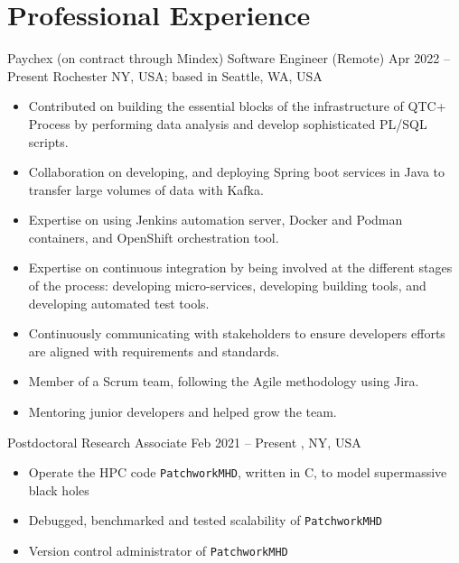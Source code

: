 \section{Professional Experience}

\cventry{}%
{Paychex (on contract through Mindex)}%
{Software Engineer (Remote)}%
{Apr 2022 -- Present}%
{Rochester NY, USA; based in Seattle, WA, USA}%
{%
\begin{itemize}
	\item Contributed on building the essential blocks of the infrastructure of QTC+ Process by performing data analysis and develop sophisticated PL/SQL scripts.
	\item Collaboration on developing, and deploying Spring boot services in Java to transfer large volumes of data with Kafka.
	\item Expertise on using Jenkins automation server, Docker and Podman containers, and OpenShift orchestration tool.
	\item Expertise on continuous integration by being involved at the different stages of the process: developing micro-services, developing building tools, and developing automated test tools.
	\item Continuously communicating with stakeholders to ensure developers efforts are aligned with requirements and standards.
	\item Member of a Scrum team, following the Agile methodology using Jira.
	\item Mentoring junior developers and helped grow the team.
\end{itemize}
}
\cventry{}%
{\CCRG}%
{Postdoctoral Research Associate}%
{Feb 2021 -- Present}%
{\RIT, NY, USA}%
{%
  \begin{itemize}
    \item Operate the HPC code \texttt{PatchworkMHD}, written in C, to model supermassive black holes
    \item Debugged, benchmarked and tested scalability of \texttt{PatchworkMHD}
    \item Version control administrator of \texttt{PatchworkMHD}
  \end{itemize}
}

